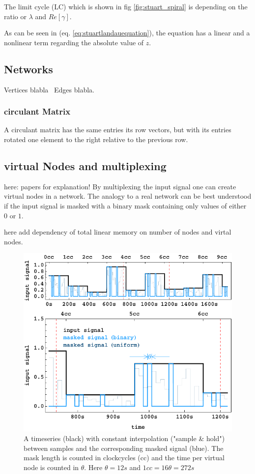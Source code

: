 The limit cycle (LC) which is shown in fig \ref{fig:stuart_spiral} is depending on the ratio or $\lambda$ and $Re \left[\gamma \right]$.





As can be seen in (eq. \ref{eq:stuartlandauequation}), the equation has a linear and a nonlinear term regarding the absolute value of $z$.

\subsection{Networks}

Vertices blabla \
Edges blabla. \

	\subsubsection{circulant Matrix}
    A circulant matrix has the same entries its row vectors, but with its entries rotated one element to the right relative to the previous row.
    
\subsection{virtual Nodes and multiplexing}
	here: papers for explanation!
	By multiplexing the input signal one can create virtual nodes in a network. The analogy to a real network can be best understood if the input signal is masked with a binary mask containing only values of either $0$ or $1$. 
	
	here add dependency of total linear memory on number of nodes and virtal nodes.

\begin{figure}
	\centering
	\includegraphics[width=0.99\linewidth]{pics/signal_mask_vis}
	\caption{A timeseries (black) with constant interpolation ("sample \& hold") between samples and the corresponding masked signal (blue). The mask length is counted in clockcycles (cc) and the time per virtual node is counted in $\theta$. Here $\theta = 12s$ and $1cc = 16 \theta = 272s $}
	\label{fig:signal_mask_vis}
\end{figure}

